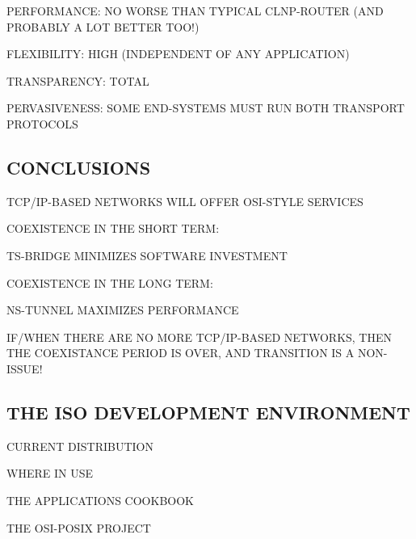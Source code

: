\begin{bwslide}

\begin{nrtc}
\item	PERFORMANCE: NO WORSE THAN TYPICAL CLNP-ROUTER (AND PROBABLY A LOT
	BETTER TOO!)

\item	FLEXIBILITY: HIGH (INDEPENDENT OF ANY APPLICATION)

\item	TRANSPARENCY: TOTAL

\item	PERVASIVENESS: SOME END-SYSTEMS MUST RUN BOTH TRANSPORT PROTOCOLS
\end{nrtc}
\end{bwslide}


\begin{bwslide}
\part*	{CONCLUSIONS}\bf

\begin{nrtc}
\item	TCP/IP-BASED NETWORKS WILL OFFER OSI-STYLE SERVICES

\item	COEXISTENCE IN THE SHORT TERM:
    \begin{nrtc}
    \item	TS-BRIDGE MINIMIZES SOFTWARE INVESTMENT
    \end{nrtc}

\item	COEXISTENCE IN THE LONG TERM:
    \begin{nrtc}
    \item	NS-TUNNEL MAXIMIZES PERFORMANCE
    \end{nrtc}

\item	IF/WHEN THERE ARE NO MORE TCP/IP-BASED NETWORKS, THEN THE
	COEXISTANCE PERIOD IS OVER, AND TRANSITION IS A NON-ISSUE!
\end{nrtc}
\end{bwslide}


\begin{bwslide}
\part	{THE ISO DEVELOPMENT ENVIRONMENT}\bf

\begin{nrtc}
\item	CURRENT DISTRIBUTION

\item	WHERE IN USE

\item	THE APPLICATIONS COOKBOOK

\item	THE OSI-POSIX PROJECT
\end{nrtc}
\end{bwslide}


